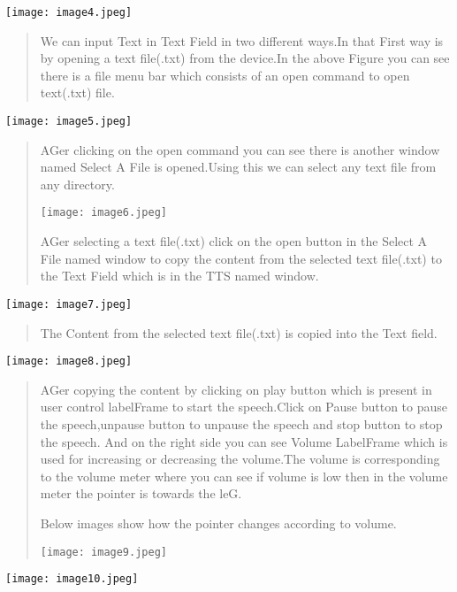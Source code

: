 \documentclass[]{article}
\begin{document}
\texttt{[image: image4.jpeg]}

\begin{quote}
We can input Text in Text Field in two diﬀerent ways.In that First way
is by opening a text ﬁle(.txt) from the device.In the above Figure you
can see there is a ﬁle menu bar which consists of an open command to
open text(.txt) ﬁle.
\end{quote}

\texttt{[image: image5.jpeg]}

\begin{quote}
AGer clicking on the open command you can see there is another window
named Select A File is opened.Using this we can select any text ﬁle from
any directory.

\texttt{[image: image6.jpeg]}

AGer selecting a text ﬁle(.txt) click on the open button in the Select A
File named window to copy the content from the selected text ﬁle(.txt)
to the Text Field which is in the TTS named window.
\end{quote}

\texttt{[image: image7.jpeg]}

\begin{quote}
The Content from the selected text ﬁle(.txt) is copied into the Text
ﬁeld.
\end{quote}

\texttt{[image: image8.jpeg]}

\begin{quote}
AGer copying the content by clicking on play button which is present in
user control labelFrame to start the speech.Click on Pause button to
pause the speech,unpause button to unpause the speech and stop button to
stop the speech. And on the right side you can see Volume LabelFrame
which is used for increasing or decreasing the volume.The volume is
corresponding to the volume meter where you can see if volume is low
then in the volume meter the pointer is towards the leG.

Below images show how the pointer changes according to volume.

\texttt{[image: image9.jpeg]}
\end{quote}

\texttt{[image: image10.jpeg]}
\end{document}
